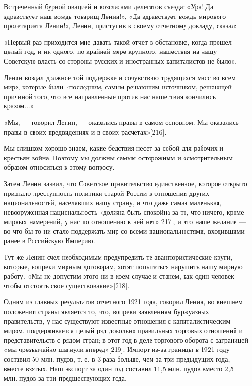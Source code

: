 \documentclass[12pt, a4paper, openany]{book}
\begin{document}
Встреченный бурной овацией и возгласами делегатов съезда: «Ура! Да здравствует наш вождь товарищ Ленин!», «Да здравствует вождь мирового пролетариата Ленин!», Ленин, приступив к своему отчетному докладу, сказал:

«Первый раз приходится мне давать такой отчет в обстановке, когда прошел целый год, и ни одного, по крайней мере крупного, нашествия на нашу Советскую власть со стороны русских и иностранных капиталистов не было».

Ленин воздал должное той поддержке и сочувствию трудящихся масс во всем мире, которые были «последним, самым решающим источником, решающей причиной того, что все направленные против нас нашествия кончились крахом...».

«Мы, — говорил Ленин, — оказались правы в самом основном. Мы оказались правы в своих предвидениях и в своих расчетах»[216].

Мы слишком хорошо знаем, какие бедствия несет за собой для рабочих и крестьян война. Поэтому мы должны самым осторожным и осмотрительным образом относиться к этому вопросу.

Затем Ленин заявил, что Советское правительство единственное, которое открыто признало преступность политики старой России в отношении других национальностей, населявших нашу страну, и что даже самая маленькая, невооруженная национальность «должна быть спокойна за то, что ничего, кроме мирных намерений, у нас по отношению к ней нет»[217], и что наше желание — во что бы то ни стало поддержать мир со всеми национальностями, входившими ранее в Российскую Империю.

Тут же Ленин счел необходимым предупредить те авантюристические круги, которые, вопреки мирным договорам, хотят попытаться нарушить нашу мирную работу. «Мы не допустим этого ни в коем случае и станем, как один человек, чтобы отстоять свое существование»[218].

Одним из главных результатов отчетного 1921 года, говорил Ленин, во внешнем положении страны является то, что, вопреки заявлениям буржуазных правительств, у нас существуют известные отношения с капиталистическим миром, поддерживается целый ряд довольно правильных торговых отношений и представительств с рядом стран; в этот год в деле торгового оборота с заграницей «мы чрезвычайно шагнули вперед»[219]. Импорт из-за границы в 1921 году составил 50 млн. пудов, т. е. в 3 раза больше, чем за три предыдущих года, вместе взятых. Наш экспорт за один год составил 11,5 млн. пудов вместо 2,5 млн. пудов за три предшествующих года.
\end{document}
